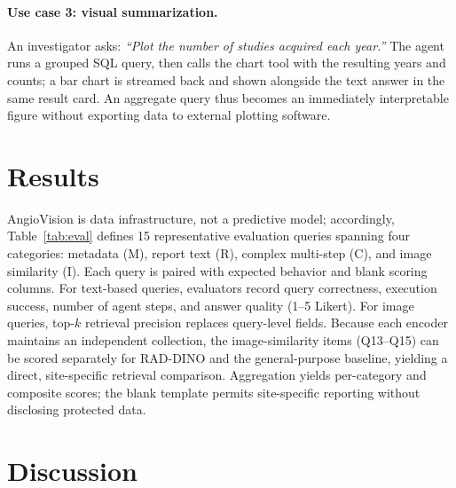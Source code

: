 \documentclass[11pt]{article}
\begin{document}
\paragraph{Use case 3: visual summarization.}
An investigator asks: \emph{``Plot the number of studies acquired each year.''}
The agent runs a grouped SQL query, then calls the chart tool with the resulting
years and counts; a bar chart is streamed back and shown alongside the text
answer in the same result card. An aggregate query thus becomes an immediately
interpretable figure without exporting data to external plotting software.

\section{Results}

AngioVision is data infrastructure, not a predictive model;
accordingly, Table~\ref{tab:eval} defines 15 representative evaluation queries
spanning four categories: metadata (M), report text (R), complex multi-step (C),
and image similarity (I). Each query is paired with expected behavior and blank
scoring columns. For text-based queries, evaluators record query correctness,
execution success, number of agent steps, and answer quality (1--5 Likert). For
image queries, top-$k$ retrieval precision replaces query-level fields. Because
each encoder maintains an independent collection, the image-similarity items
(Q13--Q15) can be scored separately for RAD-DINO and the general-purpose
baseline, yielding a direct, site-specific retrieval comparison.
Aggregation yields per-category and composite scores; the blank template permits
site-specific reporting without disclosing protected data.

\section{Discussion}
\end{document}
